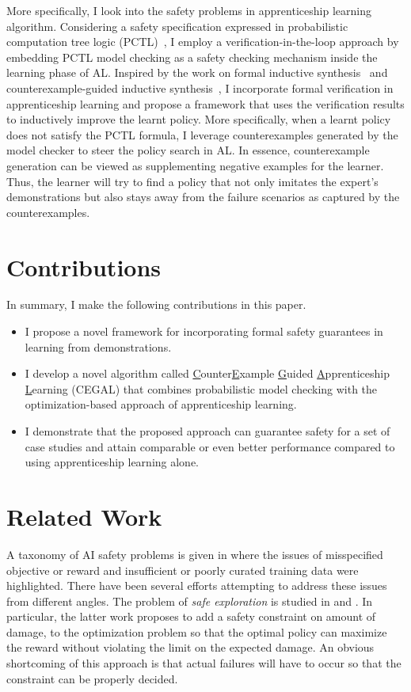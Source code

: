 More specifically, I look into the safety problems in apprenticeship learning algorithm. Considering a safety specification expressed in probabilistic computation tree logic (PCTL)~\cite{Hansson1994}, I employ a verification-in-the-loop approach by embedding PCTL model checking as a safety checking mechanism inside the learning phase of AL. Inspired by the work on formal inductive synthesis~\cite{jha-ai2017} and counterexample-guided inductive synthesis~\cite{CEGIS}, I incorporate formal verification in apprenticeship learning and propose a framework that uses the verification results to  inductively improve the learnt policy. 
More specifically, when a learnt policy does not satisfy the PCTL formula, I leverage counterexamples generated by the model checker to steer the policy search in AL. 
In essence, counterexample generation can be viewed as supplementing negative examples for the learner. 
Thus, the learner will try to find a policy that not only imitates the expert's demonstrations but also stays away from the failure scenarios as captured by the counterexamples. 


\section{Contributions}
In summary, I make the following contributions in this paper. 
\begin{itemize}
\item I propose a novel framework for incorporating formal safety guarantees in learning from demonstrations.
\item I develop a novel algorithm called \underline{C}ounter\underline{E}xample \underline{G}uided \underline{A}pprenticeship \underline{L}earning (CEGAL) that combines probabilistic model checking with the optimization-based approach of apprenticeship learning. 
\item I demonstrate that the proposed approach can guarantee safety for a set of case studies and attain comparable or even better performance compared to using apprenticeship learning alone.
\end{itemize}


\section{Related Work}
A taxonomy of AI safety problems is given in \cite{AmodeiOSCSM16} where the issues of misspecified objective or reward and insufficient or poorly curated training data were highlighted. There have been several efforts attempting to address these issues from different angles. The problem of {\it safe exploration} is studied in \cite{moldovan2012safe} and \cite{DBLP:journals/corr/HeldMZSA17}. In particular, the latter work proposes to add a safety constraint on amount of damage, to the optimization problem so that the optimal policy can maximize the reward without violating the limit on the expected damage. An obvious shortcoming of this approach is that actual failures will have to occur so that the constraint can be properly decided.

